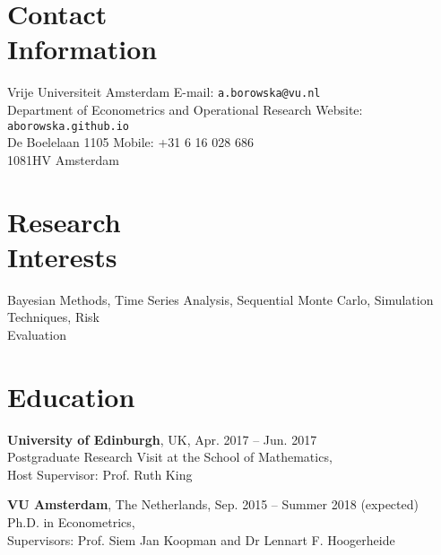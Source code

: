 \documentclass[margin,line]{resume}
\begin{document}
\begin{resume}
    \section{\mysidestyle Contact\\Information}
    Vrije Universiteit Amsterdam \hfill  E-mail: \texttt{a.borowska@vu.nl} \\
    Department of Econometrics and Operational Research \hfill Website: \texttt{aborowska.github.io}\\ \vspace{0mm}%
    De Boelelaan 1105  \hfill Mobile: +31 6 16 028 686\\
    1081HV Amsterdam\\ \vspace{-4.5mm}%
    \section{\mysidestyle Research\\Interests}
    
    Bayesian Methods, Time Series Analysis, Sequential Monte Carlo, Simulation Techniques, Risk \\ Evaluation  
    \section{\mysidestyle Education}
    \textbf{University of Edinburgh},  UK, \hfill Apr. 2017 -- Jun. 2017
	\vspace{1mm}\\
	Postgraduate Research Visit at the School of Mathematics,\\ 
    Host Supervisor: Prof. Ruth King

\vspace{-1mm}
    \textbf{VU Amsterdam},  The Netherlands, \hfill Sep. 2015 -- Summer 2018 (expected)
	\vspace{1mm}\\
	Ph.D. in Econometrics,\\ 
    Supervisors: Prof. Siem Jan Koopman and Dr Lennart F. Hoogerheide


\end{resume}
\end{document}
